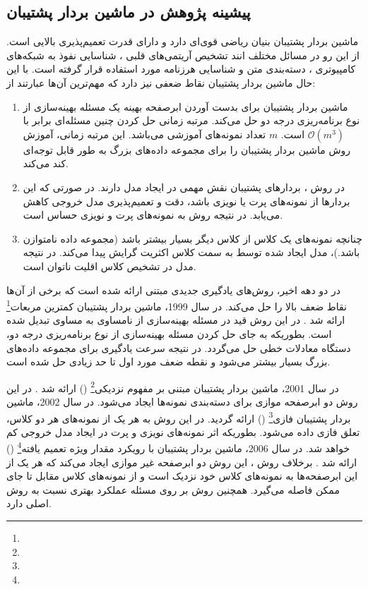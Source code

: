 \subsection{پیشینه پژوهش در ماشین بردار پشتیبان}\label{sec:2:1:4}
ماشین بردار پشتیبان بنیان ریاضی قوی‌ای دارد و دارای قدرت تعمیم‌پذیری بالایی است. از این رو در مسائل مختلف انند تشخیص آریتمی‌های قلبی \cite{nasiri2009}، شناسایی نفوذ به شبکه‌های کامپیوتری \cite{raman2017}، دسته‌بندی متن\cite{lee2012} و شناسایی 
هرزنامه \cite{zoubi2018} مورد استفاده قرار گرفته است. با این حال ماشین بردار پشتیبان نقاط ضعفی نیز دارد که مهم‌ترین آن‌ها عبارتند از:
\begin{enumerate}
	\item ماشین بردار پشتیبان برای بدست آوردن ابرصفحه بهینه یک مسئله بهینه‌سازی از نوع برنامه‌ریزی درجه دو حل می‌کند. مرتبه زمانی حل کردن چنین مسئله‌ای برابر با   $\mathcal{O}({{m}^{3}})$ است.  $m$ تعداد نمونه‌های آموزشی می‌باشد. این مرتبه زمانی، آموزش روش ماشین بردار پشتیبان را برای مجموعه داده‌های بزرگ به طور قابل توجه‌ای کند می‌کند.
	\item در روش ، بردارهای پشتیبان نقش مهمی در ایجاد مدل دارند. در صورتی که این بردارها از نمونه‌های پرت یا نویزی باشد، دقت و تعمیم‌پذیری مدل خروجی کاهش می‌یابد. در نتیجه روش  به نمونه‌های پرت و نویزی حساس است.
	\item چنانچه نمونه‌های یک کلاس از کلاس دیگر بسیار بیشتر باشد (مجموعه داده نامتوازن باشد.)، مدل ایجاد شده توسط   به سمت کلاس اکثریت گرایش پیدا می‌کند. در نتیجه مدل در تشخیص کلاس اقلیت ناتوان است.
\end{enumerate}

\indent در دو دهه اخیر، روش‌های یادگیری جدیدی مبتنی  ارائه شده است که برخی از آن‌ها نقاط ضعف بالا را حل می‌کند. در سال 1999، ماشین بردار پشتیبان کمترین مربعات\footnote{}  ارائه شد \cite{suykens1999}. در این روش قید در مسئله بهینه‌سازی از نامساوی به مساوی تبدیل شده است. بطوریکه به جای حل کردن مسئله بهینه‌سازی از نوع برنامه‌ریزی درجه دو، دستگاه معادلات خطی حل می‌گردد. در نتیجه سرعت یادگیری برای مجموعه داده‌های بزرگ بسیار بیشتر می‌شود و نقطه ضعف مورد اول تا حد زیادی حل شده است.

در سال 2001، ماشین بردار پشتیبان مبتنی بر مفهوم نزدیکی\footnote{}  () ارائه شد \cite{mang2001}. در این روش دو ابرصفحه موازی برای دسته‌بندی نمونه‌ها ایجاد می‌شود. در سال 2002، ماشین بردار پشتیبان فازی\footnote{}  () \cite{lin2002} ارائه گردید. در این روش به هر یک از نمونه‌های هر دو کلاس، تعلق فازی داده می‌شود. بطوریکه اثر نمونه‌های نویزی و پرت در ایجاد مدل خروجی کم خواهد شد. در سال 2006، ماشین بردار پشتیبان با رویکرد مقدار ویژه تعمیم یافته\footnote{}  () ارائه شد \cite{mang2006}. برخلاف روش ، این روش دو ابرصفحه غیر موازی ایجاد می‌کند که هر یک از این ابرصفحه‌ها به نمونه‌های کلاس خود نزدیک است و از نمونه‌های کلاس مقابل تا جای ممکن فاصله می‌گیرد. همچنین روش  بر روی مسئله  عملکرد بهتری نسبت به روش  اصلی دارد.

